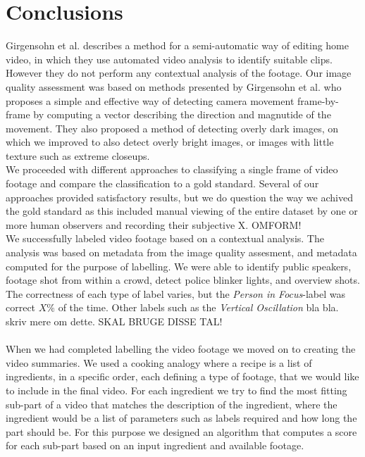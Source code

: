 \section{Conclusions}\label{sec:conc_concs}
%
Girgensohn et al.\cite{Girgensohn:2000:SAH:354401.354415} describes a method for a semi-automatic way of editing home video, in which they use automated video analysis to identify suitable clips. However they do not perform any contextual analysis of the footage. Our image quality assessment was based on methods presented by Girgensohn et al.\cite{Girgensohn:2000:SAH:354401.354415} who proposes a simple and effective way of detecting camera movement frame-by-frame by computing a vector describing the direction and magnutide of the movement. They also proposed a method of detecting overly dark images, on which we improved to also detect overly bright images, or images with little texture such as extreme closeups.\\
We proceeded with different approaches to classifying a single frame of video footage and compare the classification to a gold standard. Several of our approaches provided satisfactory results, but we do question the way we achived the gold standard as this included manual viewing of the entire dataset by one or more human observers and recording their subjective X. OMFORM!\\
We successfully labeled video footage based on a contextual analysis. The analysis was based on metadata from the image quality assesment, and metadata computed for the purpose of labelling. We were able to identify public speakers, footage shot from within a crowd, detect police blinker lights, and overview shots. 
\\
The correctness of each type of label varies, but the \emph{Person in Focus}-label was correct $X\%$ of the time. Other labels such as the \emph{Vertical Oscillation} bla bla. skriv mere om dette. SKAL BRUGE DISSE TAL!
\\\\
When we had completed labelling the video footage we moved on to creating the video summaries. We used a cooking analogy where a recipe is a list of ingredients, in a specific order, each defining a type of footage, that we would like to include in the final video. For each ingredient we try to find the most fitting sub-part of a video that matches the description of the ingredient, where the ingredient would be a list of parameters such as labels required and how long the part should be. For this purpose we designed an algorithm that computes a score for each sub-part based on an input ingredient and available footage.\\
